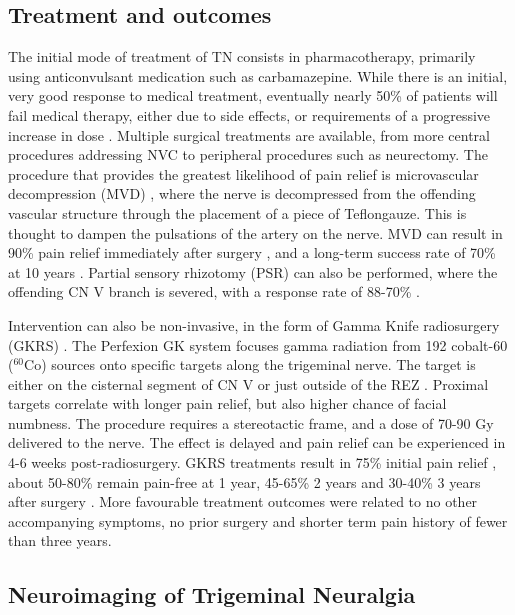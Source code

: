 \subsection{Treatment and outcomes}

The initial mode of treatment of TN consists in pharmacotherapy, primarily using anticonvulsant medication such as carbamazepine. While there is an initial, very good response to medical treatment, eventually nearly 50\% of patients will fail medical therapy, either due to side effects, or requirements of a progressive increase in dose \cite{Rappaport1994}. Multiple surgical treatments are available, from more central procedures addressing NVC to peripheral procedures such as neurectomy. The procedure that provides the greatest likelihood of pain relief is microvascular decompression (MVD) \cite{Lovely1997,Hodaie2013}, where the nerve is decompressed from the offending vascular structure through the placement of a piece of Teflon\textcopyright gauze. This is thought to dampen the pulsations of the artery on the nerve. MVD can result in 90\% pain relief immediately after surgery \cite{Zakrzewska2005}, and a long-term success rate of 70\% at 10 years \cite{Barker1996}.
Partial sensory rhizotomy (PSR) can also be performed, where the offending CN V branch is severed, with a response rate of 88-70\% \cite{Young1993,Zakrzewska2005}. 

Intervention can also be non-invasive, in the form of Gamma Knife radiosurgery (GKRS) \cite{Hodaie2012g}. The Perfexion GK system focuses gamma radiation from 192 cobalt-60 ($^{60}$Co) sources onto specific targets along the trigeminal nerve. The target is either on the cisternal segment of CN V or just outside of the REZ \cite{Daugherty2015}. Proximal targets correlate with longer pain relief, but also higher chance of facial numbness\cite{Xu2014}. The procedure requires a stereotactic frame, and a dose of 70-90 Gy delivered to the nerve. The effect is delayed and pain relief can be experienced in 4-6 weeks post-radiosurgery. GKRS treatments result in 75\% initial pain relief \cite{Tuleasca2015,Kondziolka2010}, about 50-80\% remain pain-free at 1 year, 45-65\% 2 years and 30-40\% 3 years after surgery \cite{Kondziolka2010,Sheehan2005}. More favourable treatment outcomes were related to no other accompanying symptoms, no prior surgery and shorter term pain history of fewer than three years.

\subsection{Neuroimaging of Trigeminal Neuralgia}

